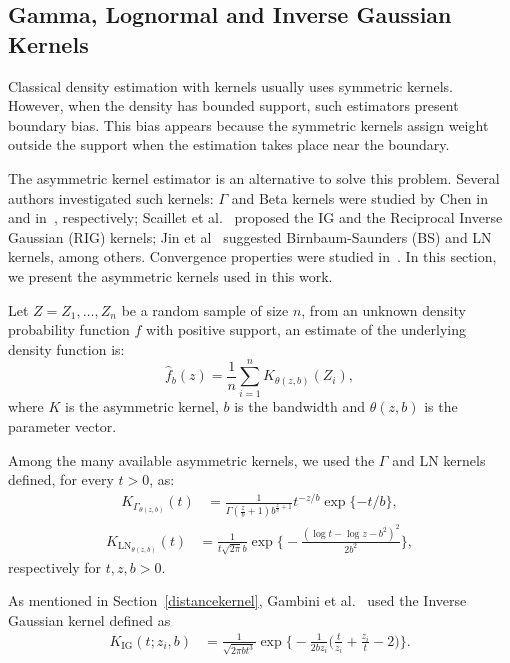 \documentclass[twocolumn]{svjour3}
\begin{document}
	\subsection{Gamma, Lognormal and Inverse Gaussian Kernels}
	\label{asymmetrickernel}
	
	Classical density estimation with kernels usually uses symmetric kernels. 
	However, when the density has bounded support, such estimators present boundary bias. 
	This bias appears because the symmetric kernels assign weight outside the support when the estimation takes place near the boundary.
	
	The asymmetric kernel estimator is an alternative to solve this problem. Several authors investigated such kernels: 
	$\Gamma$ and Beta kernels were studied by Chen in~\cite{chensx2000} and in~\cite{chen1999}, respectively; 
	Scaillet et al.~\cite{Scaillet2004} proposed the IG and the Reciprocal Inverse Gaussian (RIG) kernels; 
	Jin et al~\cite{Jin2003} suggested Birnbaum-Saunders (BS) and LN kernels, among others. 
	Convergence properties were studied in~\cite{bouezmarni2005,libengue2013}. In this section, we present the asymmetric kernels used in this work.
	
	Let $ Z = Z_1,\dots, Z_n$ be a random sample of size $n$, from an unknown density probability function $f$ with positive support, an estimate of the underlying density function is:
	$$
	\widehat{f}_b(z)=\frac{1}{n}\sum_{i=1}^n K_{\theta(z,b)}(Z_i),
	$$ 
	where $K$ is the asymmetric kernel, $b$ is the bandwidth and ${\theta}(z,b)$ is the parameter vector.
	
	Among the many available asymmetric kernels, we used the $\Gamma$ and LN kernels defined, for every $t>0$, as:
	\begin{align}
		K_{{\Gamma}_{{\theta}(z,b)}}(t) & =\frac{1}{\Gamma(\frac{z}{b}+1)b^{\frac{z}{b}+1}} t^{-{z}/{b}} \exp\{-{t}/{b}\},
		\label{gammakernel}
	\end{align}
	\begin{align}
		K_{{\text{{LN}}}_{{\theta}(z,b)}}(t) & =\frac{1}{t \sqrt{2 \pi} b} \exp\Big\{-\frac{\left(\log t - \log z -b^2\right)^2}{2b^2}\Big\},
		\label{LNkernel}
	\end{align}
	respectively for $t,z,b>0$.
	
	As mentioned in Section~\ref{distancekernel}, Gambini et al.~\cite{gambini2015} used the Inverse Gaussian kernel defined as
	\begin{align}
		K_{\text{IG}}( t; z_i,b) & =\frac{1}{\sqrt{2\pi b t^3}} 
		\exp\Big\{-\frac{1}{2b z_i} \Big(\frac{t}{z_i}+\frac{z_i}{t}-2\Big)\Big\}.
	\end{align}
	
\end{document}
